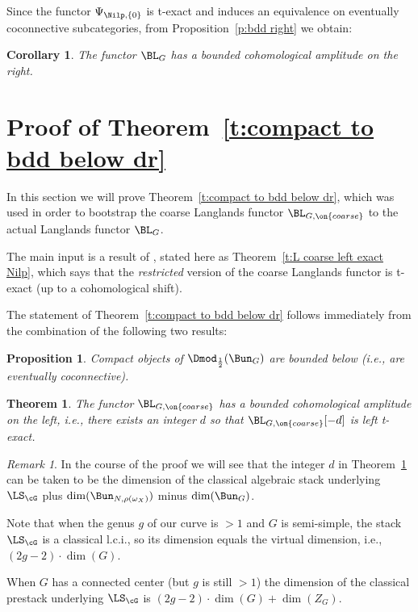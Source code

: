 \documentclass[9pt]{amsart}
\newtheorem{cor}[subsubsection]{Corollary}
\newtheorem{prop}[subsubsection]{Proposition}
\newtheorem{thm}[subsubsection]{Theorem}
\theoremstyle{remark}
\newtheorem{rem}[subsubsection]{Remark}
\theoremstyle{definition}
\theoremstyle{remark}
\newcommand{\thmref}[1]{Theorem~\ref{#1}}
\newcommand{\propref}[1]{Proposition~\ref{#1}}
\numberwithin{equation}{section}
\begin{document}
\sssec{}

Since the functor $\Psi_{\Nilp,\{0\}}$ is t-exact and induces an equivalence on eventually coconnective
subcategories, from \propref{p:bdd right} we obtain:

\begin{cor} \label{c:bdd right} 
The functor $\BL_G$ has a bounded cohomological amplitude on the right. 
\end{cor} 

\section{Proof of \thmref{t:compact to bdd below dr}} \label{s:proof of dr}

In this section we will prove \thmref{t:compact to bdd below dr}, which was used in order to bootstrap
the coarse Langlands functor $\BL_{G,\on{coarse}}$ to the actual Langlands functor $\BL_G$.

\medskip

The main input is a result of \cite{FR}, stated here as \thmref{t:L coarse left exact Nilp}, which says that the \emph{restricted} 
version of the coarse Langlands functor is t-exact (up to a cohomological shift). %


The statement of \thmref{t:compact to bdd below dr} follows immediately from the combination of the
following two results:

\begin{prop} \label{p:compact bdd below}
Compact objects of $\Dmod_{\frac{1}{2}}(\Bun_G)$ are bounded below (i.e., are eventually coconnective).  
\end{prop}

\begin{thm} \label{t:L coarse left exact}
The functor $\BL_{G,\on{coarse}}$ has a bounded cohomological amplitude on the left,  
i.e., there exists an integer $d$ so that $\BL_{G,\on{coarse}}[-d]$ is left t-exact. 
\end{thm}

\begin{rem} \label{r:left ampl}
In the course of the proof we will see that the integer $d$ in \thmref{t:L coarse left exact} can be taken to be 
the dimension of the classical algebraic stack underlying $\LS_\cG$ plus $\dim(\Bun_{N,\rho(\omega_X)})$
minus $\dim(\Bun_G)$. 

\medskip

Note that when the genus $g$ of our curve is $>1$ and $G$ is semi-simple, the stack $\LS_\cG$ is a classical l.c.i., so its dimension 
equals the virtual dimension, i.e., $(2g-2)\cdot \dim(G)$. 

\medskip

When $G$ has a connected center (but $g$ is still $>1$) the dimension
of the classical prestack underlying $\LS_\cG$ is $(2g-2)\cdot \dim(G)+\dim(Z_G)$. 

\end{rem}
\end{document}
